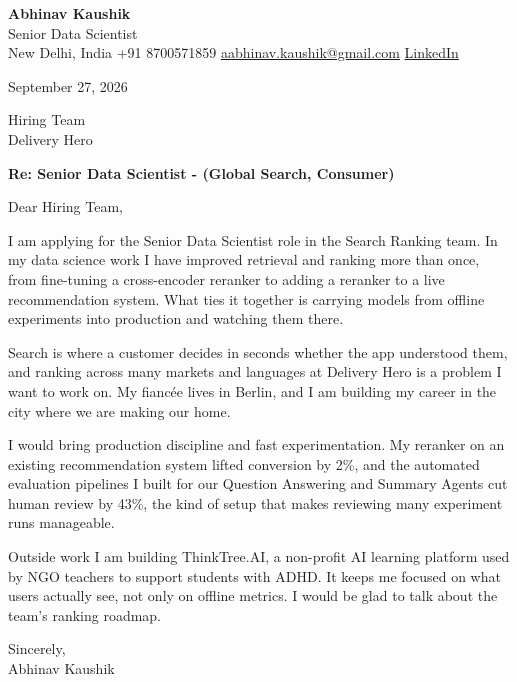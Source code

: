 \documentclass[11pt,a4paper]{article}
\begin{document}
{\Large\bfseries Abhinav Kaushik}\\
Senior Data Scientist\\
New Delhi, India \textbar{} +91 8700571859 \textbar{} \href{mailto:aabhinav.kaushik@gmail.com}{aabhinav.kaushik@gmail.com} \textbar{} \href{https://www.linkedin.com/in/abhinav-kaushik10/}{LinkedIn}  

September 27, 2026

Hiring Team\\
Delivery Hero

\textbf{Re: Senior Data Scientist - (Global Search, Consumer)}

Dear Hiring Team,

I am applying for the Senior Data Scientist role in the Search Ranking team. In my data science work I have improved retrieval and ranking more than once, from fine-tuning a cross-encoder reranker to adding a reranker to a live recommendation system. What ties it together is carrying models from offline experiments into production and watching them there.

Search is where a customer decides in seconds whether the app understood them, and ranking across many markets and languages at Delivery Hero is a problem I want to work on. My fiancée lives in Berlin, and I am building my career in the city where we are making our home.

I would bring production discipline and fast experimentation. My reranker on an existing recommendation system lifted conversion by 2\%, and the automated evaluation pipelines I built for our Question Answering and Summary Agents cut human review by 43\%, the kind of setup that makes reviewing many experiment runs manageable.

Outside work I am building ThinkTree.AI, a non-profit AI learning platform used by NGO teachers to support students with ADHD. It keeps me focused on what users actually see, not only on offline metrics. I would be glad to talk about the team's ranking roadmap.

Sincerely,\\[4pt]
Abhinav Kaushik
\end{document}
